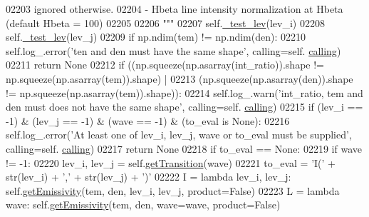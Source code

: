 \begin{DoxyCode}
02203 \textcolor{stringliteral}{                            ignored otherwise.}
02204 \textcolor{stringliteral}{            - Hbeta        line intensity normalization at Hbeta (default Hbeta = 100)}
02205 \textcolor{stringliteral}{        }
02206 \textcolor{stringliteral}{        """}
02207         self.\hyperlink{classpyneb_1_1core_1_1pynebcore_1_1_atom_afa4b9737dcd5bed31e25e8f0b6dc4730}{\_test\_lev}(lev\_i)
02208         self.\hyperlink{classpyneb_1_1core_1_1pynebcore_1_1_atom_afa4b9737dcd5bed31e25e8f0b6dc4730}{\_test\_lev}(lev\_j)
02209         \textcolor{keywordflow}{if} np.ndim(tem) != np.ndim(den):
02210             self.log\_.error(\textcolor{stringliteral}{'ten and den must have the same shape'}, calling=self.
      \hyperlink{classpyneb_1_1core_1_1pynebcore_1_1_atom_a373b7735acf4f528b54bddf373ad67a1}{calling})
02211             \textcolor{keywordflow}{return} \textcolor{keywordtype}{None}
02212         \textcolor{keywordflow}{if} ((np.squeeze(np.asarray(int\_ratio)).shape != np.squeeze(np.asarray(tem)).shape) | 
02213             (np.squeeze(np.asarray(den)).shape != np.squeeze(np.asarray(tem)).shape)):
02214             self.log\_.warn(\textcolor{stringliteral}{'int\_ratio, tem and den must does not have the same shape'}, calling=self.
      \hyperlink{classpyneb_1_1core_1_1pynebcore_1_1_atom_a373b7735acf4f528b54bddf373ad67a1}{calling})
02215         \textcolor{keywordflow}{if} (lev\_i == -1) & (lev\_j == -1) & (wave == -1) & (to\_eval \textcolor{keywordflow}{is} \textcolor{keywordtype}{None}):
02216             self.log\_.error(\textcolor{stringliteral}{'At least one of lev\_i, lev\_j, wave or to\_eval must be supplied'}, calling=self.
      \hyperlink{classpyneb_1_1core_1_1pynebcore_1_1_atom_a373b7735acf4f528b54bddf373ad67a1}{calling})
02217             \textcolor{keywordflow}{return} \textcolor{keywordtype}{None}
02218         \textcolor{keywordflow}{if} to\_eval == \textcolor{keywordtype}{None}:
02219             \textcolor{keywordflow}{if} wave != -1:
02220                 lev\_i, lev\_j = self.\hyperlink{classpyneb_1_1core_1_1pynebcore_1_1_atom_a7c9f17a3d9e841267add92377d9d1ede}{getTransition}(wave)     
02221             to\_eval = \textcolor{stringliteral}{'I('} + str(lev\_i) + \textcolor{stringliteral}{','} + str(lev\_j) + \textcolor{stringliteral}{')'} 
02222         I = \textcolor{keyword}{lambda} lev\_i, lev\_j: self.\hyperlink{classpyneb_1_1core_1_1pynebcore_1_1_atom_aaf4e84a9d5f835e6284bd9302314f775}{getEmissivity}(tem, den, lev\_i, lev\_j, product=\textcolor{keyword}{False})
02223         L = \textcolor{keyword}{lambda} wave: self.\hyperlink{classpyneb_1_1core_1_1pynebcore_1_1_atom_aaf4e84a9d5f835e6284bd9302314f775}{getEmissivity}(tem, den, wave=wave, product=\textcolor{keyword}{False})

\end{DoxyCode}

